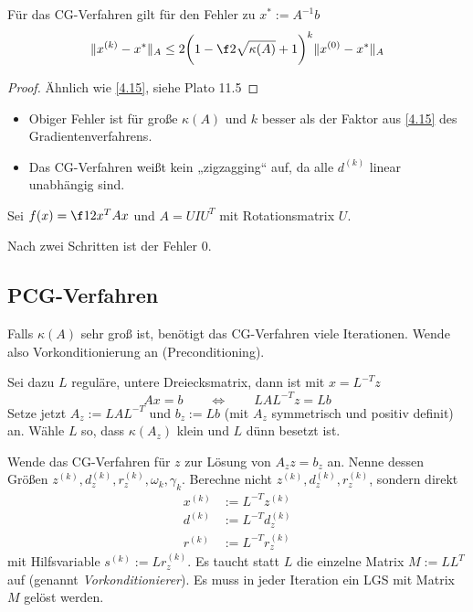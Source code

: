 \documentclass[11pt]{scrbook}
\begin{document}
\begin{st} \label{4.24}
	Für das CG-Verfahren gilt für den Fehler zu $x^* := A^{-1} b$
	\[
		\|x^{(k)} - x^*\|_A \le 2 \bigg( 1 - \f 2{{\sqrt {\kappa(A)}}+1} \bigg)^k \|x^{(0)} - x^*\|_A
	\]
	\begin{proof}
		Ähnlich wie \ref{4.15}, siehe Plato 11.5
	\end{proof}
	\begin{note}
		\begin{itemize}
			\item
				Obiger Fehler ist für große $\kappa(A)$ und $k$ besser als der Faktor aus \ref{4.15} des Gradientenverfahrens.
			\item
				Das CG-Verfahren weißt kein „zigzagging“ auf, da alle $d^{(k)}$ linear unabhängig sind.
		\end{itemize}
	\end{note}
\end{st}

\begin{ex*}
	Sei $f(x) = \f 12 x^T A x$ und $A = U I U^T$ mit Rotationsmatrix $U$.

	Nach zwei Schritten ist der Fehler 0.
\end{ex*}


\subsection{PCG-Verfahren}


Falls $\kappa(A)$ sehr groß ist, benötigt das CG-Verfahren viele Iterationen.
Wende also Vorkonditionierung an (Preconditioning).

Sei dazu $L$ reguläre, untere Dreiecksmatrix, dann ist mit $ x = L^{-T}z$
\[
	Ax = b
	\qquad \iff \qquad
	LAL^{-T} z = Lb
\]
Setze jetzt $A_z := LAL^{-T}$ und $b_z := Lb$ (mit $A_z$ symmetrisch und positiv definit) an.
Wähle $L$ so, dass $\kappa(A_z)$ klein und $L$ dünn besetzt ist.

Wende das CG-Verfahren für $z$ zur Lösung von $A_z z = b_z$ an.
Nenne dessen Größen $z^{(k)}, d_z^{(k)}, r_z^{(k)} , \omega_k, \gamma_k$.
Berechne nicht $z^{(k)}, d_z^{(k)}, r_z^{(k)}$, sondern direkt
\begin{align*}
	x^{(k)} &:= L^{-T}z^{(k)} \\
	d^{(k)} &:= L^{-T}d_z^{(k)} \\
	r^{(k)} &:= L^{-T}r_z^{(k)}
\end{align*}
mit Hilfsvariable $s^{(k)} := L r_z^{(k)}$.
Es taucht statt $L$ die einzelne Matrix $M := LL^T$ auf (genannt \emph{Vorkonditionierer}).
Es muss in jeder Iteration ein LGS mit Matrix $M$ gelöst werden.
\end{document}
